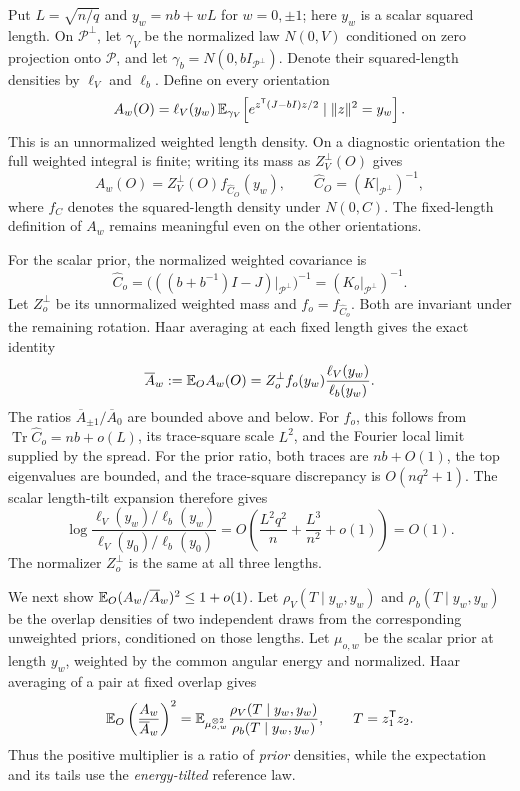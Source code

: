 Put $L=\sqrt{n/q}$ and $y_w=nb+wL$ for $w=0,\pm1$; here $y_w$ is a
scalar squared length. On $\mathcal P^\perp$, let $\gamma_V$ be the
normalized law $N(0,V)$ conditioned on zero projection onto
$\mathcal P$, and let $\gamma_b=N(0,bI_{\mathcal P^\perp})$. Denote
their squared-length densities by $\ell_V$ and $\ell_b$. Define on
every orientation
\[
 A_w(O)=\ell_V(y_w)\,
 \mathbb E_{\gamma_V}\!\left[
 e^{z^{\mathsf T}(J-bI)z/2}\mid\|z\|^2=y_w\right].
\]
This is an unnormalized weighted length density. On a diagnostic
orientation the full weighted integral is finite; writing its mass as
$Z_V^\perp(O)$ gives
\[
 A_w(O)=Z_V^\perp(O)f_{\widehat C_O}(y_w),\qquad
 \widehat C_O=(K|_{\mathcal P^\perp})^{-1},
\]
where $f_C$ denotes the squared-length density under $N(0,C)$.
The fixed-length definition of $A_w$ remains meaningful even on the
other orientations.

For the scalar prior, the normalized weighted covariance is
\[
 \widehat C_o=\bigl(((b+b^{-1})I-J)|_{\mathcal P^\perp}\bigr)^{-1}
             =(K_o|_{\mathcal P^\perp})^{-1}.
\]
Let $Z_o^\perp$ be its unnormalized weighted mass and
$f_o=f_{\widehat C_o}$. Both are invariant under the remaining
rotation. Haar averaging at each fixed length gives the exact identity
\[
 \overline A_w:=\mathbb E_O A_w(O)
 =Z_o^\perp f_o(y_w)\frac{\ell_V(y_w)}{\ell_b(y_w)}.
\]
The ratios $\overline A_{\pm1}/\overline A_0$ are bounded above and
below. For $f_o$, this follows from
$\operatorname{Tr}\widehat C_o=nb+o(L)$, its trace-square scale $L^2$,
and the Fourier local limit supplied by the spread. For the prior
ratio, both traces are $nb+O(1)$, the top eigenvalues are bounded, and
the trace-square discrepancy is $O(nq^2+1)$. The scalar length-tilt
expansion therefore gives
\[
 \log\frac{\ell_V(y_w)/\ell_b(y_w)}
          {\ell_V(y_0)/\ell_b(y_0)}
 =O\!\left(\frac{L^2q^2}{n}+\frac{L^3}{n^2}+o(1)\right)=O(1).
\]
The normalizer $Z_o^\perp$ is the same at all three lengths.

We next show $\mathbb E_O(A_w/\overline A_w)^2\le1+o(1)$. Let
$\rho_V(T\mid y_w,y_w)$ and $\rho_b(T\mid y_w,y_w)$ be the overlap
densities of two independent draws from the corresponding unweighted
priors, conditioned on those lengths. Let $\mu_{o,w}$ be the scalar
prior at length $y_w$, weighted by the common angular energy and
normalized. Haar averaging of a pair at fixed overlap gives
\[
 \mathbb E_O\left(\frac{A_w}{\overline A_w}\right)^2
 =\mathbb E_{\mu_{o,w}^{\otimes2}}
   \frac{\rho_V(T\mid y_w,y_w)}{\rho_b(T\mid y_w,y_w)},
 \qquad T=z_1^{\mathsf T}z_2.
\]
Thus the positive multiplier is a ratio of \emph{prior} densities,
while the expectation and its tails use the \emph{energy-tilted}
reference law.


